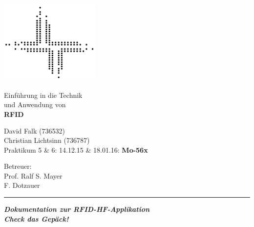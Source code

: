 \documentclass[paper=a4,fontsize=11pt,headsepline,footsepline,parskip=half]{scrartcl}
\begin{document}
\begin{titlepage}

\begin{minipage}[c]{5cm}
\includegraphics[width=5cm]{../logofbi}
\end{minipage}
\hfill
\begin{minipage}[c]{10cm}
\begin{flushright}
\Large Einführung in die Technik\\und Anwendung von\\
\LARGE \textbf{RFID}
\end{flushright}
\end{minipage}

\vspace*{1cm}

\begin{minipage}[c]{9cm}
\begin{flushleft}
\large David Falk (736532)\\Christian Lichtsinn (736787)\\Praktikum 5 \& 6: 14.12.15 \& 18.01.16: \textbf{Mo-56x}
\end{flushleft}
\end{minipage}
\hfill
\begin{minipage}[c]{7cm}
\begin{flushright}
\large Betreuer:\\Prof. Ralf S. Mayer\\F. Dotzauer
\end{flushright}
\end{minipage}

\vspace*{1cm}

\begingroup
  \setlength{\parskip}{0pt}%
  \setlength{\parindent}{0pt}%
  \setlength{\parfillskip}{0pt plus 1fil}%
  \par\rule{\linewidth}{1.5pt}\par
\endgroup


\centering
\Huge{\textbf{\textsl{\huge Dokumentation zur RFID-HF-Applikation\\ \Huge Check das Gepäck!}}}


\end{titlepage}
\end{document}
